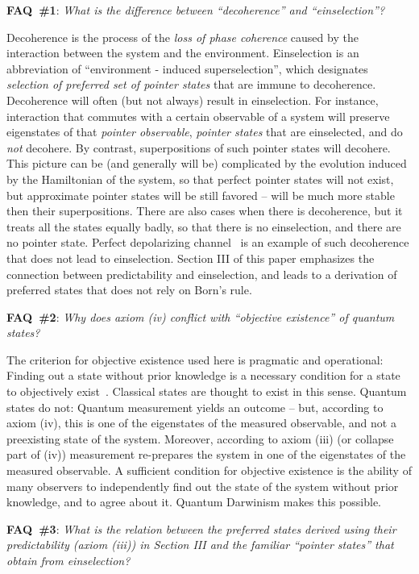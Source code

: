 \documentclass[aps,amsmath,amssymb,amsfonts,12pt]{revtex4-1}
\newcommand{\+}         {\dagger}
\begin{document}
{{{{\bf FAQ~\#1}: {\it What is the difference between ``decoherence'' and ``einselection''?}

Decoherence is the process of the {\it loss of phase coherence} caused by the interaction between the system and the environment. Einselection is an abbreviation of ``environment - induced superselection'', which designates {\it selection of preferred set of pointer states} that are immune to decoherence. Decoherence will often (but not always) result in einselection. For instance, interaction that commutes with a certain observable of a system will preserve eigenstates of that {\it pointer observable}, {\it pointer states} that are einselected, and do {\it not} decohere. By contrast, superpositions of such pointer states will decohere. This picture can be (and generally will be) complicated by the evolution induced by the Hamiltonian of the system, so that perfect pointer states will not exist, but approximate pointer states will be still favored -- will be much more stable then their superpositions. There are also cases when there is decoherence, but it treats all the states equally badly, so that there is no einselection, and there are no pointer state. Perfect depolarizing channel~\cite{NC} is an example of such decoherence that does not lead to einselection. Section III of this paper emphasizes the connection between predictability and einselection, and leads to a derivation of preferred states that does not rely on Born's rule.

{\bf FAQ~\#2}: {\it Why does axiom (iv) conflict with ``objective existence'' of quantum states?} 

The criterion for objective existence used here is pragmatic and operational: Finding out a state without prior knowledge is a necessary condition for a state to objectively exist~\cite{75,42,43,8,9,10}. Classical states are thought to exist in this sense. Quantum states do not: Quantum measurement yields an outcome -- but, according to axiom (iv), this is one of the eigenstates of the measured observable, and not a preexisting state of the system. Moreover, according to axiom (iii) (or collapse part of (iv)) measurement re-prepares the system in one of the eigenstates of the measured observable. A sufficient condition for objective existence is the ability of many observers to independently find out the state of the system without prior knowledge, and to agree about it. Quantum Darwinism makes this possible.

{\bf FAQ~\#3}: {\it What is the relation between the preferred states derived using their predictability (axiom (iii)) in Section III and the familiar ``pointer states'' that obtain from einselection?}

}}}
\end{document}
